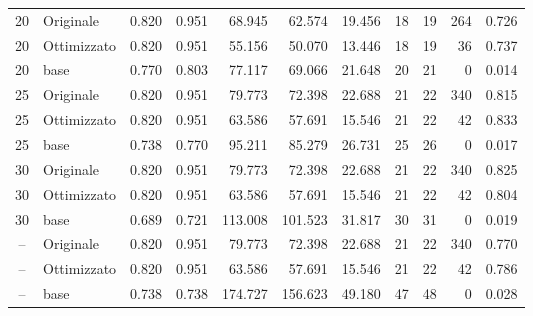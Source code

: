 \documentclass{article}
\begin{document}
\begin{table}[htbp]
\begin{tabular}{c l r r r r r r r r r}
\midrule
20 & Originale   & 0.820 & 0.951 & 68.945 & 62.574 & 19.456 & 18 & 19 & 264 & 0.726 \\
20 & Ottimizzato & 0.820 & 0.951 & 55.156 & 50.070 & 13.446 & 18 & 19 & 36 & 0.737 \\
20 & base        & 0.770 & 0.803 & 77.117 & 69.066 & 21.648 & 20 & 21 & 0 & 0.014 \\
\midrule
25 & Originale   & 0.820 & 0.951 & 79.773 & 72.398 & 22.688 & 21 & 22 & 340 & 0.815 \\
25 & Ottimizzato & 0.820 & 0.951 & 63.586 & 57.691 & 15.546 & 21 & 22 & 42 & 0.833 \\
25 & base        & 0.738 & 0.770 & 95.211 & 85.279 & 26.731 & 25 & 26 & 0 & 0.017 \\
\midrule
30 & Originale   & 0.820 & 0.951 & 79.773 & 72.398 & 22.688 & 21 & 22 & 340 & 0.825 \\
30 & Ottimizzato & 0.820 & 0.951 & 63.586 & 57.691 & 15.546 & 21 & 22 & 42 & 0.804 \\
30 & base        & 0.689 & 0.721 & 113.008 & 101.523 & 31.817 & 30 & 31 & 0 & 0.019 \\
\midrule
-- & Originale   & 0.820 & 0.951 & 79.773 & 72.398 & 22.688 & 21 & 22 & 340 & 0.770 \\
-- & Ottimizzato & 0.820 & 0.951 & 63.586 & 57.691 & 15.546 & 21 & 22 & 42 & 0.786 \\
-- & base        & 0.738 & 0.738 & 174.727 & 156.623 & 49.180 & 47 & 48 & 0 & 0.028 \\
\bottomrule
\end{tabular}
\end{table}
\end{document}

